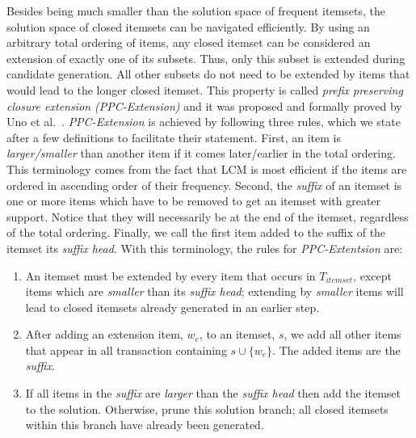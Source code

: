\documentclass{sig-alternate}
\begin{document}
Besides being much smaller than the solution space of frequent itemsets,
the solution space of closed itemsets can be navigated efficiently.
By using an arbitrary total ordering of items, any closed itemset can be
considered an extension of exactly one of its subsets.
Thus, only this subset is extended during candidate generation.
All other subsets do not need to be extended by items that would lead to
the longer closed itemset.
This property is called \emph{prefix preserving closure extension
(PPC-Extension)} and it was proposed and formally proved by
Uno et al.~\cite{uno2004lcm}.
\emph{PPC-Extension} is achieved by following three rules, which we state
after a few definitions to facilitate their statement.
First, an item is \emph{larger/smaller} than another item if it comes
later/earlier in the total ordering.
This terminology comes from the fact that LCM is most efficient if the items
are ordered in ascending order of their frequency.
Second, the \emph{suffix} of an itemset is one or more items 
which have to be removed to get
an itemset with greater support.
Notice that they will necessarily be at the end of the itemset,
regardless of the total ordering.
Finally, we call the first item added to the suffix of the itemset its
\emph{suffix head}.
With this terminology, the rules for \emph{PPC-Extentsion} are:
\begin{enumerate}
\item An itemset must be extended by every item that occurs in $T_{itemset}$, 
except items which are \emph{smaller} than its \emph{suffix head};
extending by \emph{smaller} items will lead to closed itemsets already generated in an earlier step. 
\item After adding an extension item, $w_e$, to an itemset, $s$, we add all other items that appear in all transaction containing $s \cup \{w_e\}$.
The added items are the \emph{suffix}.
\item If all items in the \emph{suffix} are \emph{larger} than the \emph{suffix head} then add the itemset to the solution. Otherwise, prune this solution branch; all closed itemsets within this branch have already been generated. %
\end{enumerate}
 
\end{document}
